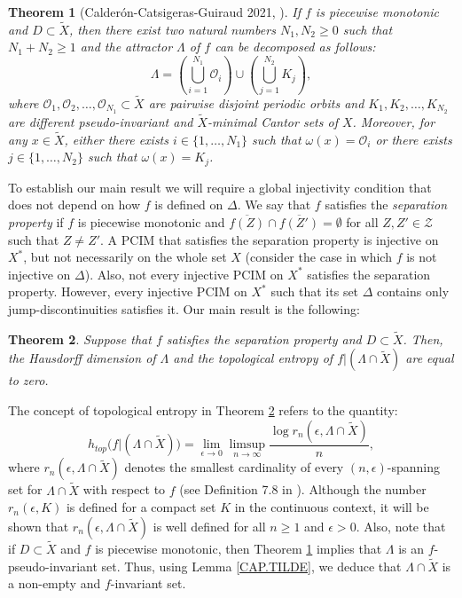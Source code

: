 \documentclass[a4paper]{article}
\newtheorem{theorem}{Theorem}[section]
\begin{document}
\begin{theorem}[Calder\'on-Catsigeras-Guiraud 2021, \cite{CCG21}]\label{PRINCIPAL}
    If $f$ is piecewise monotonic and $D\subset\widetilde X$, then there exist two natural numbers {$N_1,N_2\geq0$ such that $N_1+N_2\geq1$} and the attractor $\Lambda$ of $f$ can be decomposed as follows:
    \begin{equation}
        \Lambda=\left(\bigcup\limits_{i=1}^{N_1}\mathcal O_i\right)\cup\left(\bigcup\limits_{j=1}^{N_2}K_j\right)\!,\label{DECOMP}
    \end{equation}
    where $\mathcal O_1,\mathcal O_2,\ldots,\mathcal O_{N_1}\subset\widetilde{X}$ are pairwise disjoint periodic orbits and $K_1,K_2,\ldots,K_{N_2}$ are different pseudo-invariant and $\widetilde X$-minimal Cantor sets of $X$. Moreover, for any $x\in\widetilde X$, either there exists $i\in\{1,\dots,N_1\}$ such that $\omega(x)=\mathcal O_i$ or there exists $j\in\{1,\dots,N_2\}$ such that $\omega(x)=K_j$.
\end{theorem}

To establish our main result we will require a global injectivity condition that does not depend on how $f$ is defined on $\Delta$. We say that $f$ satisfies the {\em separation property} if $f$ is piecewise monotonic and $\overline{f(Z)}\cap \overline{f(Z')}=\emptyset$ for all $Z,Z'\in\mathcal Z$ such that $Z\neq Z'$. A PCIM that satisfies the separation property is injective on $X^*$, but not necessarily on the whole set $X$ {(consider the case in which $f$ is not injective on $\Delta$)}. Also, not every injective PCIM on $X^*$ satisfies the separation property. However, every injective PCIM on $X^*$ such that its set $\Delta$ contains only jump-discontinuities satisfies it. Our main result is the following:

\begin{theorem}\label{MAIN}
    Suppose that $f$ satisfies the separation property and $D\subset\widetilde X$. Then, the Hausdorff dimension of $\Lambda$ and the topological entropy of $f|(\Lambda\cap\widetilde X)$ are equal to zero.
\end{theorem}

The concept of topological entropy in Theorem \ref{MAIN} refers to the quantity:
\[
    h_{top}\big(f|(\Lambda\cap\widetilde X)\big)=\lim_{\epsilon\to0}\limsup_{n\to\infty}\frac{\log r_n(\epsilon,\Lambda\cap\widetilde X)}{n},
\]
where $r_n(\epsilon,\Lambda\cap\widetilde X)$ denotes the smallest cardinality of every $(n,\epsilon)$-spanning set for $\Lambda\cap\widetilde X$ with respect to $f$ (see Definition 7.8 in \cite{Wa00}). Although the number $r_n(\epsilon,K)$ is defined for a compact set $K$ in the continuous context, it will be shown that $r_n(\epsilon,\Lambda\cap\widetilde X)$ is well defined for all $n\geq1$ and $\epsilon>0$. Also, note that if $D \subset \widetilde X$ and $f$ is piecewise monotonic, then Theorem \ref{PRINCIPAL} implies that $\Lambda$ is an $f$-pseudo-invariant set. Thus, using Lemma \ref{CAP.TILDE}, we deduce that $\Lambda \cap\widetilde X$ is a non-empty and $f$-invariant set.
\end{document}

